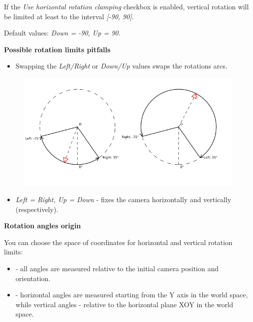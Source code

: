 \documentclass[a4paper,12pt,oneside]{sphinxmanual}
\begin{document}
If the \emph{Use horizontal rotation clamping} checkbox is enabled, vertical rotation will be limited at least to the interval \emph{{[}-90, 90{]}}.

Default values: \emph{Down = -90, Up = 90}.

\begin{DUlineblock}{0em}
\item[] 
\end{DUlineblock}

\textbf{Possible rotation limits pitfalls}
\begin{itemize}
\item {} 
Swapping the \emph{Left/Right} or \emph{Down/Up} values swaps the rotations arcs.

\end{itemize}
\begin{figure}[htbp]
\centering

\includegraphics{limits_inversion.png}
\end{figure}
\begin{itemize}
\item {} 
\emph{Left = Right, Up = Down} - fixes the camera horizontally and vertically (respectively).

\end{itemize}

\begin{DUlineblock}{0em}
\item[] 
\end{DUlineblock}

\textbf{Rotation angles origin}

You can choose the space of coordinates for horizontal and vertical rotation limits:
\begin{itemize}
\item {} 
 - all angles are measured relative to the initial camera position and orientation.

\item {} 
 - horizontal angles are measured starting from the Y axis in the world space, while vertical angles - relative to the horizontal plane XOY in the world space.

\end{itemize}
\end{document}
